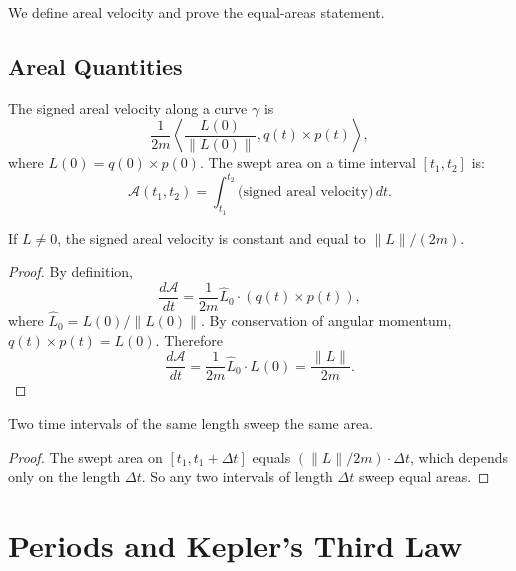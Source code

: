 We define areal velocity and prove the equal-areas statement.

\section{Areal Quantities}

\begin{definition}\label{def:area}
The signed areal velocity along a curve $\gamma$ is
\[
  \frac{1}{2m}
  \left\langle
    \frac{L(0)}{\|L(0)\|},
    q(t) \times p(t)
  \right\rangle,
\]
where $L(0) = q(0) \times p(0)$.
The swept area on a time interval $[t_1, t_2]$ is:
\[
  \mathcal{A}(t_1, t_2) = \int_{t_1}^{t_2} \text{(signed areal velocity)}\,dt.
\]
\leanok
\end{definition}

\begin{theorem}\label{thm:second-law}
If $L \neq 0$, the signed areal velocity is constant and equal to $\|L\|/(2m)$.
\leanok
\begin{proof}
By definition,
\[
  \frac{d\mathcal{A}}{dt}
  = \frac{1}{2m}\hat L_0 \cdot (q(t) \times p(t)),
\]
where $\hat L_0 = L(0)/\|L(0)\|$.
By conservation of angular momentum, $q(t) \times p(t) = L(0)$.
Therefore
\[
  \frac{d\mathcal{A}}{dt}
  = \frac{1}{2m}\hat L_0 \cdot L(0)
  = \frac{\|L\|}{2m}.
\]
\end{proof}
\end{theorem}

\begin{theorem}\label{thm:equal-areas}
Two time intervals of the same length sweep the same area.
\leanok
\begin{proof}
The swept area on $[t_1, t_1 + \Delta t]$ equals $(\|L\|/2m) \cdot \Delta t$, which depends only on the length $\Delta t$.
So any two intervals of length $\Delta t$ sweep equal areas.
\end{proof}
\end{theorem}

\chapter{Periods and Kepler's Third Law}

